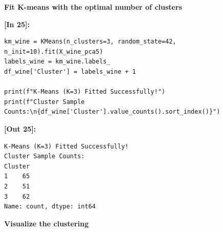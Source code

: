 \vspace{0.3em}
\begin{tcolorbox}[colback=gray!5!white,colframe=gray!50!black,boxrule=0.5pt,arc=2pt,left=4pt,right=4pt,top=2pt,bottom=2pt,unbreakable,before upper={\sloppy\raggedright}]
{\small\bfseries Fit K-means with the optimal number of clusters\par}
\end{tcolorbox}

\vspace{0.4em}
\noindent\textbf{\small [In 25]:}
\begin{lstlisting}[style=pycode]
km_wine = KMeans(n_clusters=3, random_state=42, n_init=10).fit(X_wine_pca5)
labels_wine = km_wine.labels_
df_wine['Cluster'] = labels_wine + 1

print(f"K-Means (K=3) Fitted Successfully!")
print(f"Cluster Sample Counts:\n{df_wine['Cluster'].value_counts().sort_index()}")
\end{lstlisting}
\noindent\textbf{\small [Out 25]:}
\begin{lstlisting}[style=output]
K-Means (K=3) Fitted Successfully!
Cluster Sample Counts:
Cluster
1    65
2    51
3    62
Name: count, dtype: int64
\end{lstlisting}

\vspace{0.3em}
\begin{tcolorbox}[colback=gray!5!white,colframe=gray!50!black,boxrule=0.5pt,arc=2pt,left=4pt,right=4pt,top=2pt,bottom=2pt,unbreakable,before upper={\sloppy\raggedright}]
{\small\bfseries Visualize the clustering\par}
\end{tcolorbox}

